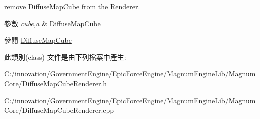 remove \hyperlink{class_i_dream_sky_1_1_diffuse_map_cube}{Diffuse\+Map\+Cube} from the Renderer. 


\begin{DoxyParams}{參數}
{\em cube,a} & \hyperlink{class_i_dream_sky_1_1_diffuse_map_cube}{Diffuse\+Map\+Cube} \\
\hline
\end{DoxyParams}
\begin{DoxySeeAlso}{參閱}
\hyperlink{class_i_dream_sky_1_1_diffuse_map_cube}{Diffuse\+Map\+Cube} 
\end{DoxySeeAlso}


此類別(class) 文件是由下列檔案中產生\+:\begin{DoxyCompactItemize}
\item 
C\+:/innovation/\+Government\+Engine/\+Epic\+Force\+Engine/\+Magnum\+Engine\+Lib/\+Magnum\+Core/Diffuse\+Map\+Cube\+Renderer.\+h\item 
C\+:/innovation/\+Government\+Engine/\+Epic\+Force\+Engine/\+Magnum\+Engine\+Lib/\+Magnum\+Core/Diffuse\+Map\+Cube\+Renderer.\+cpp\end{DoxyCompactItemize}
